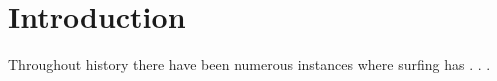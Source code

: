 \chapter{Introduction}

Throughout history there have been numerous instances where surfing has . . . \lipsum[4-6]
